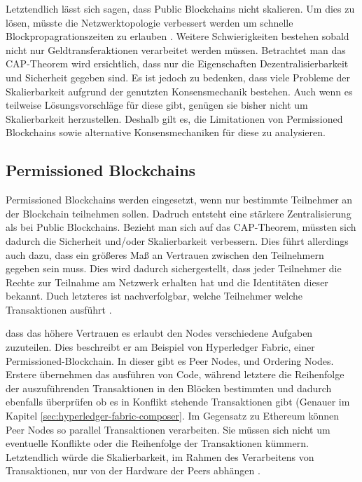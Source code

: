 Letztendlich lässt sich sagen, dass Public Blockchains nicht skalieren. Um dies zu lösen, müsste die Netzwerktopologie verbessert werden um schnelle Blockpropagrationszeiten zu erlauben \cite{SchererPerformanceScalabilityBlockchain2017}. Weitere Schwierigkeiten bestehen sobald nicht nur Geldtransferaktionen verarbeitet werden müssen. Betrachtet man das CAP-Theorem wird ersichtlich, dass nur die Eigenschaften Dezentralisierbarkeit und Sicherheit gegeben sind. Es ist jedoch zu bedenken, dass viele Probleme der Skalierbarkeit aufgrund der genutzten Konsensmechanik bestehen. Auch wenn es teilweise Lösungsvorschläge für diese gibt, genügen sie bisher nicht um Skalierbarkeit herzustellen. Deshalb gilt es, die Limitationen von Permissioned Blockchains sowie alternative Konsensmechaniken für diese zu analysieren.


\subsection{Permissioned Blockchains}
Permissioned Blockchains werden eingesetzt, wenn nur bestimmte Teilnehmer an der Blockchain teilnehmen sollen. Dadruch entsteht eine stärkere Zentralisierung als bei Public Blockchains. Bezieht man sich auf das CAP-Theorem, müssten sich dadurch die Sicherheit und/oder Skalierbarkeit verbessern. Dies führt allerdings auch dazu, dass ein größeres Maß an Vertrauen zwischen den Teilnehmern gegeben sein muss. Dies wird dadurch sichergestellt, dass jeder Teilnehmer die Rechte zur Teilnahme am Netzwerk erhalten hat und die Identitäten dieser bekannt. Duch letzteres ist nachverfolgbar, welche Teilnehmer welche Transaktionen ausführt \cite{SchererPerformanceScalabilityBlockchain2017}.

 dass das höhere Vertrauen es erlaubt den Nodes verschiedene Aufgaben zuzuteilen. Dies beschreibt er am Beispiel von Hyperledger Fabric, einer Permissioned-Blockchain. In dieser gibt es Peer Nodes, und Ordering Nodes. Erstere übernehmen das ausführen von Code, während letztere die Reihenfolge der auszuführenden Transaktionen in den Blöcken bestimmten und dadurch ebenfalls überprüfen ob es in Konflikt stehende Transaktionen gibt (Genauer im Kapitel \ref{sec:hyperledger-fabric-composer}. Im Gegensatz zu Ethereum können Peer Nodes so parallel Transaktionen verarbeiten. Sie müssen sich nicht um eventuelle Konflikte oder die Reihenfolge der Transaktionen kümmern. Letztendlich würde die Skalierbarkeit, im Rahmen des Verarbeitens von Transaktionen, nur von der Hardware der Peers abhängen \cite{SchererPerformanceScalabilityBlockchain2017}.


